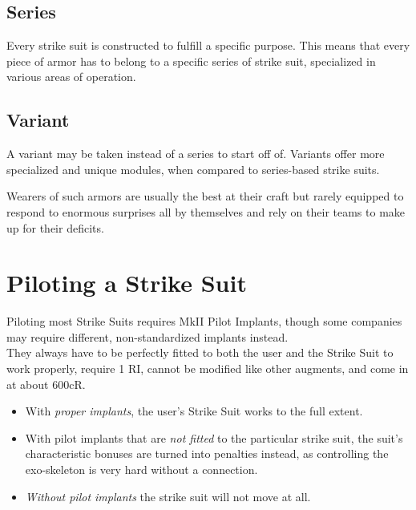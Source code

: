\documentclass[12pt,a4paper,openany]{book}
\begin{document}
	\section{Series}
	Every strike suit is constructed to fulfill a specific purpose. This means that every piece of armor has to belong to a specific series of strike suit, specialized in various areas of operation.
	
    \begin{multicols}{2}
    	\raggedcolumns
    \end{multicols}
    
    \pagebreak
    \section{Variant}
    A variant may be taken instead of a series to start off of. Variants offer more specialized and unique modules, when compared to series-based strike suits.
    \par
    Wearers of such armors are usually the best at their craft but rarely equipped to respond to enormous surprises all by themselves and rely on their teams to make up for their deficits.
    \par
    
    \begin{multicols}{2}
    	\raggedcolumns
    \end{multicols}
    
    \chapter{Piloting a Strike Suit}
    Piloting most Strike Suits requires MkII Pilot Implants, though some companies may require different, non-standardized implants instead.\\
    They always have to be perfectly fitted to both the user and the Strike Suit to work properly, require 1 RI, cannot be modified like other augments, and come in at about 600cR.\\
    \begin{itemize}
    	\item With \emph{proper implants}, the user's Strike Suit works to the full extent.
    	\item With pilot implants that are \emph{not fitted} to the particular strike suit, the suit's characteristic bonuses are turned into penalties instead, as controlling the exo-skeleton is very hard without a connection.
    	\item \emph{Without pilot implants} the strike suit will not move at all.
    \end{itemize}
    
\end{document}
